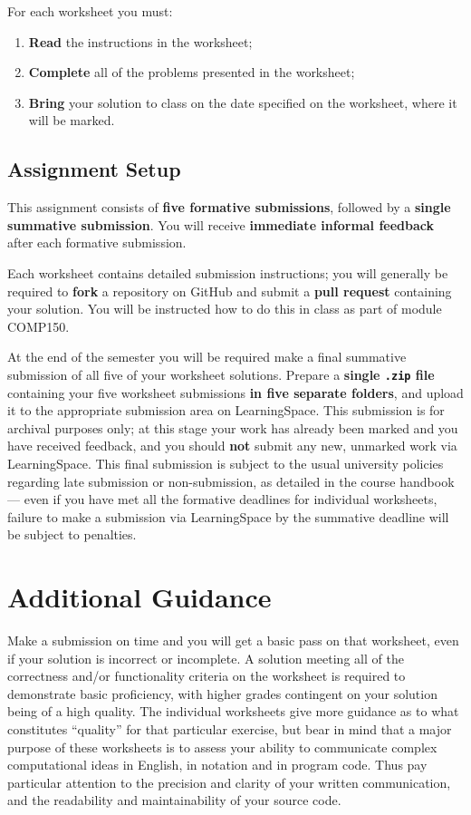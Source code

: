 \documentclass{../fal_assignment}
\begin{document}
For each worksheet you must:
\begin{enumerate}[label=(\roman*)]
    \item \textbf{Read} the instructions in the worksheet;
    \item \textbf{Complete} all of the problems presented in the worksheet;
    \item \textbf{Bring} your solution to class on the date specified on the worksheet,
    	where it will be marked.
\end{enumerate}

\subsection*{Assignment Setup}

This assignment consists of \textbf{five formative submissions}, followed by a \textbf{single summative submission}.
You will receive \textbf{immediate informal feedback} after each formative submission.

Each worksheet contains detailed submission instructions; you will generally be required to \textbf{fork} a repository on GitHub and submit a \textbf{pull request} containing your solution. You will be instructed how to do this in class as part of module COMP150.

At the end of the semester you will be required make a final summative submission of all five of your worksheet solutions.
Prepare a \textbf{single \texttt{.zip} file} containing your five worksheet submissions \textbf{in five separate folders}, and upload it to the appropriate submission area on LearningSpace.
This submission is for archival purposes only; at this stage your work has already been marked and you have received feedback, and you should \textbf{not} submit any new, unmarked work via LearningSpace.
This final submission is subject to the usual university policies regarding late submission or non-submission,
as detailed in the course handbook ---
even if you have met all the formative deadlines for individual worksheets,
failure to make a submission via LearningSpace by the summative deadline will be subject to penalties.

\section*{Additional Guidance}

Make a submission on time and you will get a basic pass on that worksheet,
even if your solution is incorrect or incomplete.
A solution meeting all of the correctness and/or functionality criteria on the worksheet is required to demonstrate basic proficiency,
with higher grades contingent on your solution being of a high quality.
The individual worksheets give more guidance as to what constitutes ``quality'' for that particular exercise,
but bear in mind that a major purpose of these worksheets is to assess your ability to communicate
complex computational ideas in English, in notation and in program code.
Thus pay particular attention to the precision and clarity of your written communication,
and the readability and maintainability of your source code.
\end{document}
